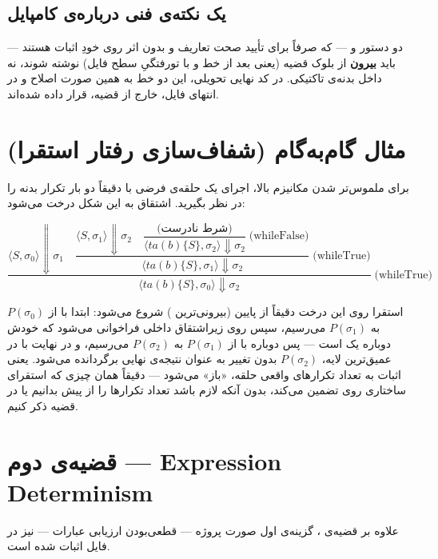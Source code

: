 \documentclass[12pt]{report}
\begin{document}
	\subsection{یک نکته‌ی فنی درباره‌ی کامپایل}
	دو دستور  و  --- که صرفاً برای تأیید صحت  تعاریف و بدون اثر روی خودِ اثبات هستند --- باید \textbf{بیرون} از بلوک  قضیه (یعنی بعد از خط  و با تورفتگیِ سطح فایل) نوشته شوند، نه داخل بدنه‌ی تاکتیکی. در کد نهایی تحویلی، این دو خط به همین صورت اصلاح و در انتهای فایل، خارج از قضیه، قرار داده شده‌اند.
	
	\section{مثال گام‌به‌گام (شفاف‌سازی رفتار استقرا)}
	
	برای ملموس‌تر شدن مکانیزم بالا، اجرای یک حلقه‌ی فرضی با دقیقاً دو بار تکرار بدنه را در نظر بگیرید. اشتقاق  به این شکل درخت می‌شود:
	
	\[
	\dfrac{
		\langle S,\sigma_0\rangle \Downarrow \sigma_1
		\quad
		\dfrac{
			\langle S,\sigma_1\rangle \Downarrow \sigma_2
			\quad
			\dfrac{
				\text{(شرط نادرست)}
			}{
				\langle \mathit{ta}(b)\{S\}, \sigma_2\rangle \Downarrow \sigma_2
			}\;\text{(whileFalse)}
		}{
			\langle \mathit{ta}(b)\{S\}, \sigma_1\rangle \Downarrow \sigma_2
		}\;\text{(whileTrue)}
	}{
		\langle \mathit{ta}(b)\{S\}, \sigma_0\rangle \Downarrow \sigma_2
	}\;\text{(whileTrue)}
	\]
	
استقرا روی این درخت دقیقاً از پایین (بیرونی‌ترین ) شروع می‌شود: ابتدا با  از $P(\sigma_0)$ به $P(\sigma_1)$ می‌رسیم، سپس  روی زیر‌اشتقاق داخلی فراخوانی می‌شود که خودش دوباره یک  است --- پس دوباره با  از $P(\sigma_1)$ به $P(\sigma_2)$ می‌رسیم، و در نهایت با  در عمیق‌ترین لایه، $P(\sigma_2)$ بدون تغییر به عنوان نتیجه‌ی نهایی برگردانده می‌شود. یعنی اثبات به تعداد تکرارهای واقعی حلقه، «باز» می‌شود --- دقیقاً همان چیزی که استقرای ساختاری روی  تضمین می‌کند، بدون آنکه لازم باشد تعداد تکرارها را از پیش بدانیم یا در قضیه ذکر کنیم.
	
	\section{قضیه‌ی دوم --- Expression Determinism}
	
	علاوه بر قضیه‌ی ، گزینه‌ی اول صورت پروژه --- قطعی‌بودن ارزیابی عبارات --- نیز در فایل  اثبات شده است.
	
\end{document}
